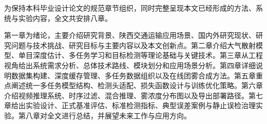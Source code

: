 为保持本科毕业设计论文的规范章节组织，同时完整呈现本文已经形成的方法、系统与实验内容，全文共安排八章。

第一章为绪论，主要介绍研究背景、陕西交通运输应用场景、国内外研究现状、研究问题与技术挑战、研究目标与主要内容以及本文创新点。第二章介绍大气散射模型、单目深度估计、多任务学习和目标检测等理论基础与关键技术。第三章从工程视角给出系统需求分析、总体技术路线、模块划分和应用场景分析。第四章详细说明数据集构建、深度缓存管理、多任务数据组织以及在线团雾合成方法。第五章重点阐述统一多任务模型结构、检测头适配、损失函数设计与训练优化策略。第六章介绍视频推理系统、时序过滤、混合推理、雾浓度分布图以及导出部署路径。第七章给出实验设计、正式基准评估、标准检测指标、典型误差案例与静止误检治理实验。第八章对全文进行总结，并展望未来工作与应用方向。
